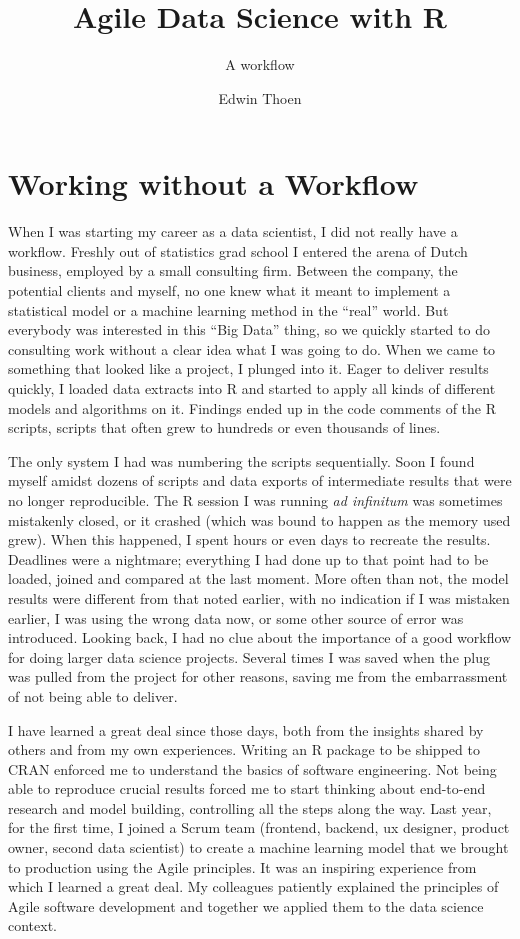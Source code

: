 \documentclass[]{book}
\title{Agile Data Science with R}
\subtitle{A workflow}
\author{Edwin Thoen}
\date{}
\begin{document}
\maketitle

{
\setcounter{tocdepth}{1}
\tableofcontents
}
\hypertarget{working-without-a-workflow}{%
\chapter{Working without a Workflow}\label{working-without-a-workflow}}

When I was starting my career as a data scientist, I did not really have a workflow.
Freshly out of statistics grad school I entered the arena of Dutch business, employed by a small consulting firm.
Between the company, the potential clients and myself, no one knew what it meant to implement a statistical model or a machine learning method in the ``real'' world.
But everybody was interested in this ``Big Data'' thing, so we quickly started to do consulting work without a clear idea what I was going to do.
When we came to something that looked like a project, I plunged into it.
Eager to deliver results quickly, I loaded data extracts into R and started to apply all kinds of different models and algorithms on it.
Findings ended up in the code comments of the R scripts, scripts that often grew to hundreds or even thousands of lines.

The only system I had was numbering the scripts sequentially.
Soon I found myself amidst dozens of scripts and data exports of intermediate results that were no longer reproducible.
The R session I was running \emph{ad infinitum} was sometimes mistakenly closed, or it crashed (which was bound to happen as the memory used grew).
When this happened, I spent hours or even days to recreate the results.
Deadlines were a nightmare; everything I had done up to that point had to be loaded, joined and compared at the last moment.
More often than not, the model results were different from that noted earlier, with no indication if I was mistaken earlier, I was using the wrong data now, or some other source of error was introduced.
Looking back, I had no clue about the importance of a good workflow for doing larger data science projects.
Several times I was saved when the plug was pulled from the project for other reasons, saving me from the embarrassment of not being able to deliver.

I have learned a great deal since those days, both from the insights shared by others and from my own experiences.
Writing an R package to be shipped to CRAN enforced me to understand the basics of software engineering.
Not being able to reproduce crucial results forced me to start thinking about end-to-end research and model building, controlling all the steps along the way.
Last year, for the first time, I joined a Scrum team (frontend, backend, ux designer, product owner, second data scientist) to create a machine learning model that we brought to production using the Agile principles.
It was an inspiring experience from which I learned a great deal.
My colleagues patiently explained the principles of Agile software development and together we applied them to the data science context.
\end{document}
